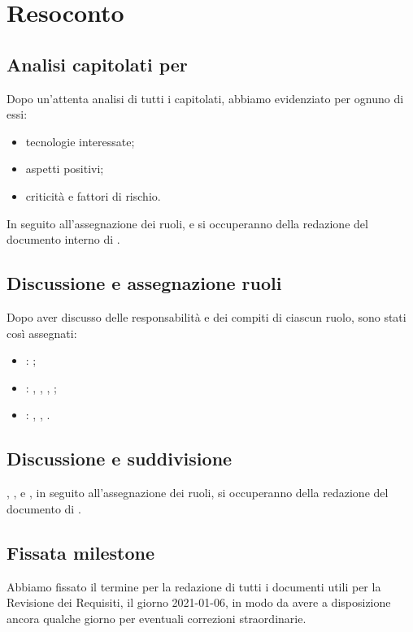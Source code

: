 \section{Resoconto}

\subsection{Analisi capitolati per \SdF{}}
Dopo un'attenta analisi di tutti i capitolati, abbiamo evidenziato per ognuno di essi:
	\begin{itemize}
		\item tecnologie interessate;
		\item aspetti positivi;
		\item criticità e fattori di rischio.
	\end{itemize}
In seguito all'assegnazione dei ruoli, \GB{} e \MDI{} si occuperanno della redazione del documento interno di \SdF{}.

\subsection{Discussione e assegnazione ruoli}
Dopo aver discusso delle responsabilità e dei compiti di ciascun ruolo, sono stati così assegnati:
	\begin{itemize}
		\item \respProg : \MB;
		\item \ammProg : \SB , \FD , \NM , \VAS;
		\item \analProg : \GB , \MDI , \MB.
	\end{itemize}

\subsection{Discussione e suddivisione \NdP}
\SB , \FD , \NM{} e \VAS{}, in seguito all'assegnazione dei ruoli, si occuperanno della redazione del documento di \NdP{}.

\subsection{Fissata milestone}
Abbiamo fissato il termine per la redazione di tutti i documenti utili per la Revisione dei Requisiti, il giorno 2021-01-06, in modo da avere a disposizione ancora qualche giorno per eventuali correzioni straordinarie.